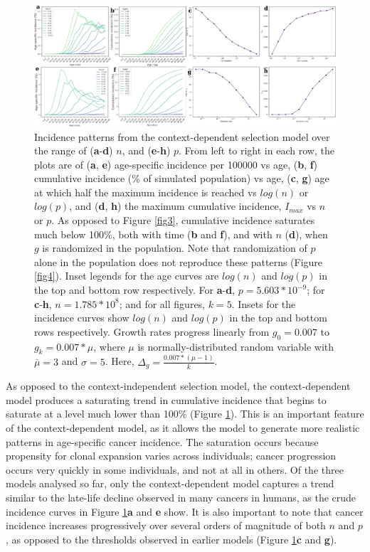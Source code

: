\documentclass[12pt,onecolumn,twoside]{article}
\begin{document}
\begin{figure}[!h]
	\centering
	\includegraphics[width=\linewidth, keepaspectratio=true]{fig5.png}
	\caption{Incidence patterns from the context-dependent selection model over the range of (\textbf{a}-\textbf{d}) $n$, and (\textbf{e}-\textbf{h}) $p$. From left to right in each row, the plots are of (\textbf{a}, \textbf{e}) age-specific incidence per 100000 vs age, (\textbf{b}, \textbf{f}) cumulative incidence (\% of simulated population) vs age, (\textbf{c}, \textbf{g}) age at which half the maximum incidence is reached vs $log(n)$ or $log(p)$, and (\textbf{d}, \textbf{h}) the maximum cumulative incidence, $I_{max}$ vs $n$ or $p$. As opposed to Figure \ref{fig3}, cumulative incidence saturates much below 100\%, both with time (\textbf{b} and \textbf{f}), and with $n$ (\textbf{d}), when $g$ is randomized in the population. Note that randomization of $p$ alone in the population does not reproduce these patterns (Figure \ref{fig4}). Inset legends for the age curves are $log(n)$ and $log(p)$ in the top and bottom row respectively. For \textbf{a}-\textbf{d}, $p=5.603*10^{-9}$; for \textbf{c}-\textbf{h}, $n=1.785*10^{8}$; and for all figures, $k=5$. Insets for the incidence curves show $log(n)$ and $log(p)$ in the top and bottom rows respectively. Growth rates progress linearly from $g_{0}=0.007$ to $g_{k}=0.007*\mu$, where $\mu$ is normally-distributed random variable with $\overline{\mu}=3$ and $\sigma=5$. Here, $\Delta_{g}=\frac{0.007*(\mu-1)}{k}$.}
	\label{fig5}
\end{figure} 

As opposed to the context-independent selection model, the context-dependent model produces a saturating trend in cumulative incidence that begins to saturate at a level much lower than 100\% (Figure \ref{fig5}). This is an important feature of the context-dependent model, as it allows the model to generate more realistic patterns in age-specific cancer incidence. The saturation occurs because propensity for clonal expansion varies across individuals; cancer progression occurs very quickly in some individuals, and not at all in others. Of the three models analysed so far, only the context-dependent model captures a trend similar to the late-life decline observed in many cancers in humans, as the crude incidence curves in Figure \ref{fig5}\textbf{a} and \textbf{e} show. It is also important to note that cancer incidence increases progressively over several orders of magnitude of both $n$ and $p$, as opposed to the thresholds observed in earlier models (Figure \ref{fig5}\textbf{c} and \textbf{g}).
\end{document}
